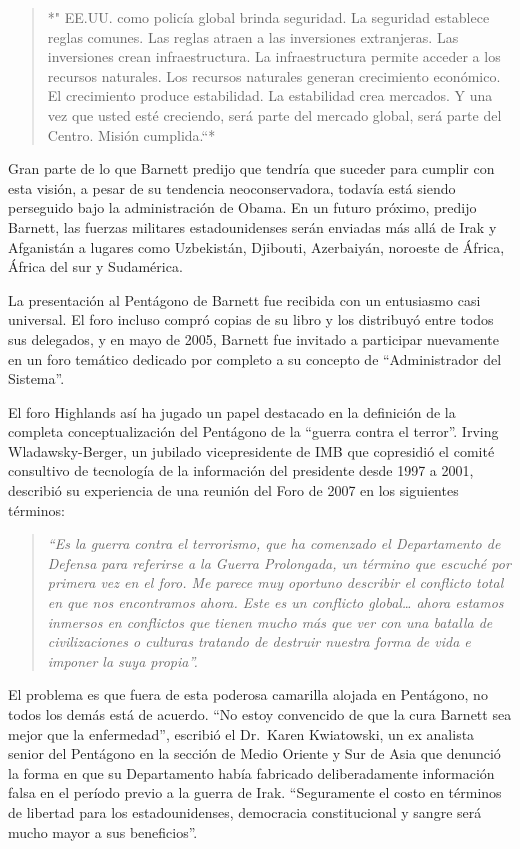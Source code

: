 \documentclass[10pt,a5paper,twoside,spanish,]{book}
\begin{document}
\begin{quote}
*" EE.UU. como policía global brinda seguridad. La seguridad establece
reglas comunes. Las reglas atraen a las inversiones extranjeras. Las
inversiones crean infraestructura. La infraestructura permite acceder a
los recursos naturales. Los recursos naturales generan crecimiento
económico. El crecimiento produce estabilidad. La estabilidad crea
mercados. Y una vez que usted esté creciendo, será parte del mercado
global, será parte del Centro. Misión cumplida.``*
\end{quote}

Gran parte de lo que Barnett predijo que tendría que suceder para
cumplir con esta visión, a pesar de su tendencia neoconservadora,
todavía está siendo perseguido bajo la administración de Obama. En un
futuro próximo, predijo Barnett, las fuerzas militares estadounidenses
serán enviadas más allá de Irak y Afganistán a lugares como Uzbekistán,
Djibouti, Azerbaiyán, noroeste de África, África del sur y Sudamérica.

La presentación al Pentágono de Barnett fue recibida con un entusiasmo
casi universal. El foro incluso compró copias de su libro y los
distribuyó entre todos sus delegados, y en mayo de 2005, Barnett fue
invitado a participar nuevamente en un foro temático dedicado por
completo a su concepto de ``Administrador del Sistema''.

El foro Highlands así ha jugado un papel destacado en la definición de
la completa conceptualización del Pentágono de la ``guerra contra el
terror''. Irving Wladawsky-Berger, un jubilado vicepresidente de IMB que
copresidió el comité consultivo de tecnología de la información del
presidente desde 1997 a 2001, describió su experiencia de una reunión
del Foro de 2007 en los siguientes términos:

\begin{quote}
\emph{``Es la guerra contra el terrorismo, que ha comenzado el
Departamento de Defensa para referirse a la Guerra Prolongada, un
término que escuché por primera vez en el foro. Me parece muy oportuno
describir el conflicto total en que nos encontramos ahora. Este es un
conflicto global\ldots{} ahora estamos inmersos en conflictos que tienen
mucho más que ver con una batalla de civilizaciones o culturas tratando
de destruir nuestra forma de vida e imponer la suya propia''.}
\end{quote}

El problema es que fuera de esta poderosa camarilla alojada en
Pentágono, no todos los demás está de acuerdo. ``No estoy convencido de
que la cura Barnett sea mejor que la enfermedad'', escribió el Dr.~Karen
Kwiatowski, un ex analista senior del Pentágono en la sección de Medio
Oriente y Sur de Asia que denunció la forma en que su Departamento había
fabricado deliberadamente información falsa en el período previo a la
guerra de Irak. ``Seguramente el costo en términos de libertad para los
estadounidenses, democracia constitucional y sangre será mucho mayor a
sus beneficios''.
\end{document}
